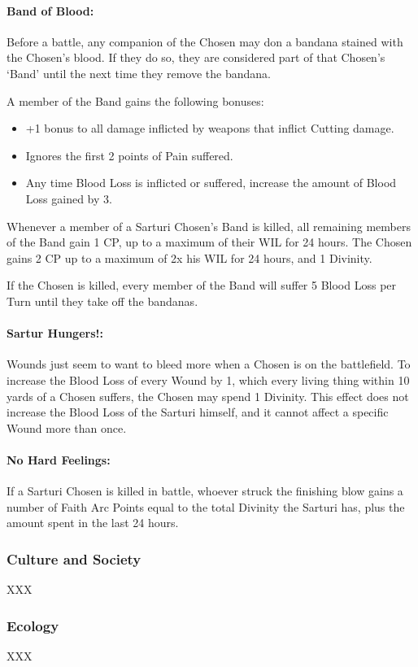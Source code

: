 \documentclass[oneside,11pt,english]{book}
\begin{document}
 

\paragraph{Band of Blood:}
Before a battle, any companion of the Chosen may don a bandana stained with the Chosen's blood. If they do so, they are considered part of that Chosen's ‘Band’ until the next time they remove the bandana. 


A member of the Band gains the following bonuses: 
\begin{itemize}
\item +1 bonus to all damage inflicted by weapons that inflict Cutting damage. 
\item Ignores the first 2 points of Pain suffered. 
\item Any time Blood Loss is inflicted or suffered, increase the amount of Blood Loss gained 
by 3. 
\end{itemize}
Whenever a member of a Sarturi Chosen's Band is killed, all remaining members of the Band 
gain 1 CP, up to a maximum of their WIL for 24 hours. The Chosen gains 2 CP up to a maximum 
of 2x his WIL for 24 hours, and 1 Divinity. 


If the Chosen is killed, every member of the Band will suffer 5 Blood Loss per Turn until they 
take off the bandanas. 
\paragraph{Sartur Hungers!:}
Wounds just seem to want to bleed more when a Chosen is on the battlefield. To increase the 
Blood Loss of every Wound by 1, which every living thing within 10 yards of a Chosen suffers, 
the Chosen may spend 1 Divinity. This effect does not increase the Blood Loss of the Sarturi 
himself, and it cannot affect a specific Wound more than once. 
\paragraph{No Hard Feelings:}
If a Sarturi Chosen is killed in battle, whoever struck the finishing blow gains a number of Faith 
Arc Points equal to the total Divinity the Sarturi has, plus the amount spent in the last 24 hours. 
\subsubsection*{Culture and Society} 
XXX 
\subsubsection*{Ecology} 
XXX 
\end{document}
